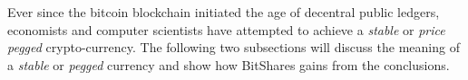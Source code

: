 Ever since the bitcoin blockchain initiated the age of decentral public
ledgers, economists and computer scientists have attempted to achieve a
\emph{stable} or \emph{price pegged} crypto-currency. The following two
subsections will discuss the meaning of a \emph{stable} or \emph{pegged}
currency and show how BitShares gains from the conclusions.
